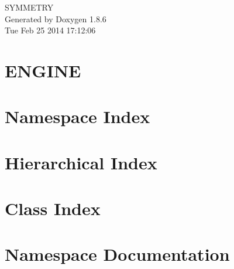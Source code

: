 \documentclass[twoside]{book}
\newcommand{\clearemptydoublepage}{%
  \newpage{\pagestyle{empty}\cleardoublepage}%
}
\begin{document}
\hypersetup{pageanchor=false}
\begin{titlepage}
\vspace*{7cm}
\begin{center}%
{\Large S\-Y\-M\-M\-E\-T\-R\-Y }\\
\vspace*{1cm}
{\large Generated by Doxygen 1.8.6}\\
\vspace*{0.5cm}
{\small Tue Feb 25 2014 17:12:06}\\
\end{center}
\end{titlepage}
\clearemptydoublepage
\tableofcontents
\clearemptydoublepage
{}
\hypersetup{pageanchor=true}

\chapter{E\-N\-G\-I\-N\-E}
\label{index}\hypertarget{index}{}
\chapter{Namespace Index}

\chapter{Hierarchical Index}

\chapter{Class Index}

\chapter{Namespace Documentation}

\end{document}
